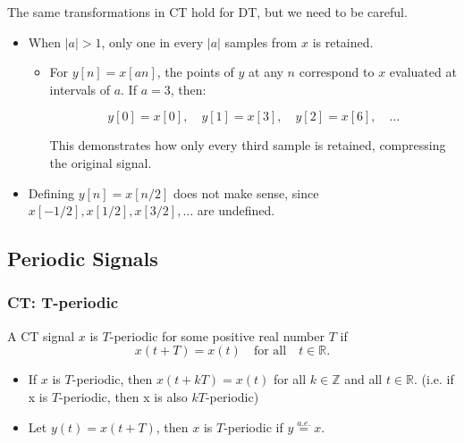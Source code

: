     \begin{warning}
        The same transformations in CT hold for DT, but we need to be careful. 
        \begin{itemize}
            \item When $|a|>1$, only one in every $|a|$ samples from $x$ is retained.
            \begin{itemize}
                \item For \(y[n] = x[an]\), the points of \(y\) at any \(n\) correspond to \(x\) evaluated at intervals of \(a\). If \(a = 3\), then:

                \[
                y[0] = x[0], \quad y[1] = x[3], \quad y[2] = x[6], \quad \dots
                \]
                
                This demonstrates how only every third sample is retained, compressing the original signal.
            \end{itemize}
            
            \item Defining $y[n] = x[n/2]$ does not make sense, since $x[-1/2], x[1/2],x[3/2],\ldots$ are undefined.
        \end{itemize}    
    \end{warning}

\subsection{Periodic Signals}
    \subsubsection{CT: T-periodic}
    \begin{definition}
        A CT signal \(x\) is $T$-periodic for some positive real number \(T\) if
        \begin{equation}
            x(t + T) = x(t) \quad \text{for all} \quad t \in \mathbb{R}.
        \end{equation}

        \begin{itemize}
            \item If $x$ is $T$-periodic, then \(x(t + kT) = x(t)\) for all \(k \in \mathbb{Z}\) and all \(t \in \mathbb{R}\). (i.e. if x is $T$-periodic, then x is also $kT$-periodic)
            \item Let \(y(t) = x(t + T)\), then \(x\) is \(T\)-periodic if $y \overset{a.e.}{=} x$.
        \end{itemize}
    \end{definition}

